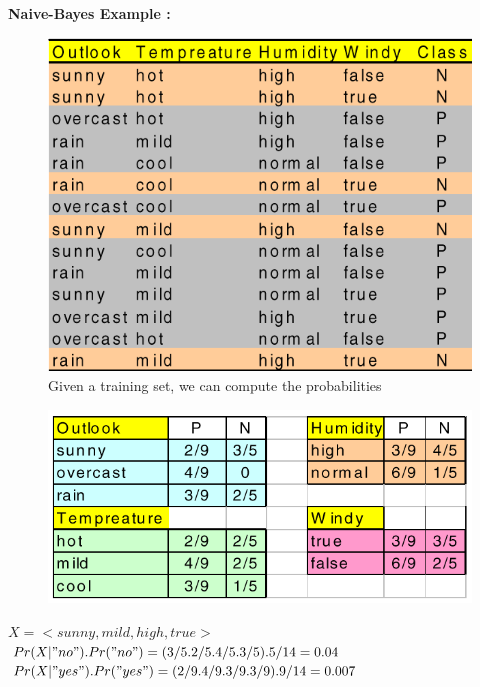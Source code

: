 \documentclass[10pt,a4paper]{article}
\begin{document}
{			\textbf{Naive-Bayes Example : }
			\begin{center}
				\begin{figure}[!htbp]
					\includegraphics[scale=0.7]{nb1.png}
					\caption{Given a training set, we can compute the probabilities}
				\end{figure}
			\end{center} 
			\newpage
				\begin{center}
					\begin{figure}[!htbp]
						\includegraphics[scale=0.7]{nb2.png}
					\end{figure}
				\end{center}
			

			$X = <sunny, mild, high, true>$
			\\
			$Pr(X | "no").Pr("no") = (3/5 . 2/5 . 4/5 . 3/5) . 5/14 = 0.04$
			\\
			$Pr(X | "yes").Pr("yes") = (2/9 . 4/9 . 3/9 . 3/9) . 9/14 = 0.007$
			\\
		
		
		
		
		
		
		
		
		
		
		
		
		
		
		
		
		
		
		
		}
	
\end{document}
